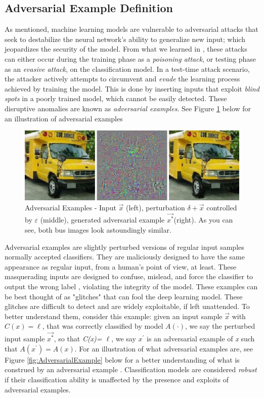 \documentclass[grad,lot,lof,11pt,oneside,onehalfspace]{RUthesis}
\begin{document}
\subsection{Adversarial Example Definition}
As mentioned, machine learning models are vulnerable to adversarial attacks that seek to destabilize the neural network's ability to generalize new input; which jeopardizes the security of the model. From what we learned in \cite{huang_adversarial_2011}, these attacks can either occur during the training phase as a \textit{poisoning attack}, or testing phase as an \textit{evasive attack}, on the classification model. In a  test-time attack scenario, the attacker actively attempts to circumvent and \textit{evade} the learning process achieved by training the model. This is done by inserting inputs that exploit \textit{blind spots} in a poorly trained model, which cannot be easily detected. These disruptive anomalies are known as \textit{adversarial examples}. See Figure \ref{fig:adversarial_example} below for an illustration of adversarial examples \\
\begin{figure}[h]
\centering
\includegraphics[width=0.7\linewidth]{"Images/Chapter 2/adversarial_example"}
\caption{Adversarial Examples - Input $\vec{x}$ (left), perturbation \textit{$\delta+\vec{x}$} controlled by $\varepsilon$ (middle), generated adversarial example $\vec{x^{*}}$(right). As you can see, both bus images look astoundingly similar. } 
\label{fig:adversarial_example}
\end{figure}
Adversarial examples are slightly perturbed versions of regular input samples normally accepted classifiers. They are maliciously designed to have the same appearance as regular input, from a human's point of view, at least. These masquerading inputs are designed to confuse, mislead, and force the classifier to output the wrong label \cite{hosseini_blocking_2017}, violating the integrity of the model. These examples can be best thought of as "glitches" that can fool the deep learning model. These glitches are difficult to detect and are widely exploitable, if left unattended.  To better understand them, consider this example: given an input sample $\vec{x}$ with \textit{$C(x) = \ell $}, that was correctly classified by model \textit{$A(\cdotp)$}, we say the perturbed input sample \textit{$\vec{x^{*}}$}, so that \textit{C(x)= $\ell$}, we say $x^{'}$ is an adversarial example of \textit{x} such that \textit{$A(x^{'}) = A(x)$}. For an illustration of what adversarial examples are, see Figure \ref{fig:AdversarialExample} below for a better understanding of what is construed by an adversarial example \cite{papernot_transferability_2016}. Classification models are considered \textit{robust} if their classification ability is unaffected by the presence and exploits of adversarial examples.
\end{document}
